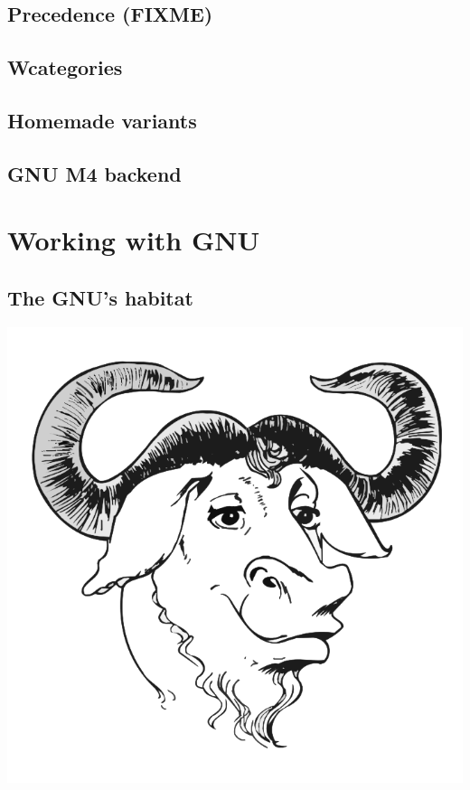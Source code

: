 \documentclass{beamer}
\begin{document}
\subsection{Precedence (FIXME)}
\subsection{Wcategories}
\subsection{Homemade variants}
\subsection{GNU M4 backend}

\begin{frame}
\end{frame}

\section{Working with GNU}

\subsection{The GNU's habitat}

\begin{frame}
  \begin{center}
    \includegraphics[scale=0.3]{gnu}
  \end{center}
\end{frame}
\end{document}
